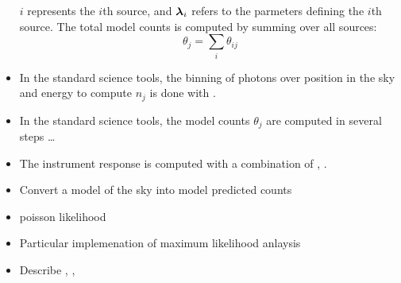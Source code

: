 \begin{itemize}
    $i$ represents the $i$th source, and $\boldsymbol{\lambda}_i$ refers to the
    parmeters defining the $i$th source. The total model counts
    is computed by summing over all sources:
    \begin{equation}
      \theta_j = \sum_i \theta_{ij}
    \end{equation}
  \item In the standard \fermi science tools, 
    the binning of photons over position in the sky and energy to compute $n_j$ 
    is done with \gtbin.
  \item In the standard \fermi science tools, the 
    model counts $\theta_j$ are computed in several steps \ldots

  \item The instrument response is computed with a combination of \gtltcube,
    \gtexpcube.

  \item Convert a model of the sky into model predicted counts
  \item poisson likelihood
  \item Particular implemenation of maximum likelihood anlaysis
  \item Describe \gtbin, \gtselect, \gtlike
\end{itemize}


